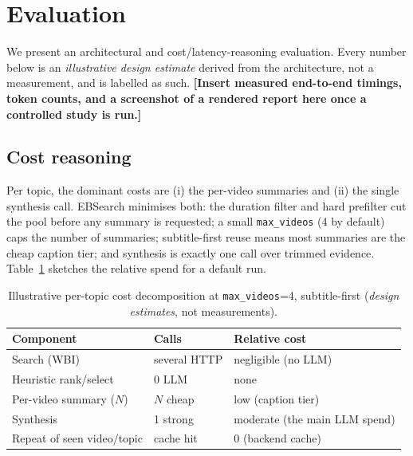 \documentclass[conference]{IEEEtran}
\begin{document}
\section{Evaluation}
\label{sec:eval}

We present an architectural and cost/latency-reasoning evaluation. Every number
below is an \emph{illustrative design estimate} derived from the architecture,
not a measurement, and is labelled as such.
\textbf{[Insert measured end-to-end timings, token counts, and a screenshot of a
rendered report here once a controlled study is run.]}

\subsection{Cost reasoning}

Per topic, the dominant costs are (i) the per-video summaries and (ii) the single
synthesis call. EBSearch minimises both: the duration filter and hard prefilter
cut the pool before any summary is requested; a small \texttt{max\_videos} (4 by
default) caps the number of summaries; subtitle-first reuse means most summaries
are the cheap caption tier; and synthesis is exactly one call over trimmed
evidence. Table~\ref{tab:cost} sketches the relative spend for a default run.

\begin{table}[t]
\centering
\caption{Illustrative per-topic cost decomposition at \texttt{max\_videos}=4,
subtitle-first (\emph{design estimates}, not measurements).}
\label{tab:cost}
\footnotesize
\begin{tabular}{@{}lll@{}}
\toprule
\textbf{Component} & \textbf{Calls} & \textbf{Relative cost} \\
\midrule
Search (WBI)              & several HTTP & negligible (no LLM) \\
Heuristic rank/select     & 0 LLM        & none \\
Per-video summary ($N$)   & $N$ cheap    & low (caption tier) \\
Synthesis                 & 1 strong     & moderate (the main LLM spend) \\
Repeat of seen video/topic& cache hit    & 0 (backend cache) \\
\bottomrule
\end{tabular}
\end{table}
\end{document}
